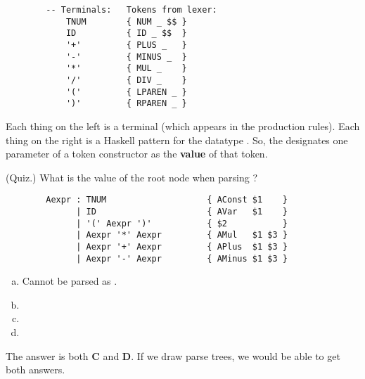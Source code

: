 \documentclass[letterpaper]{article}
\begin{document}
\begin{itemize}
    \begin{verbatim}
        -- Terminals:   Tokens from lexer:
            TNUM        { NUM _ $$ }
            ID          { ID _ $$  }
            '+'         { PLUS _   }
            '-'         { MINUS _  }
            '*'         { MUL _    }
            '/'         { DIV _    }
            '('         { LPAREN _ }
            ')'         { RPAREN _ }\end{verbatim}
    Each thing on the left is a terminal (which appears in the production rules). Each thing on the right is a Haskell pattern for the datatype . So, the \code{\$\$} designates one parameter of a token constructor as the \textbf{value} of that token. 
\end{itemize}

\begin{mdframed}[]
    (Quiz.) What is the value of the root  node when parsing ?

    \begin{verbatim}
        Aexpr : TNUM                    { AConst $1    }
              | ID                      { AVar   $1    }
              | '(' Aexpr ')'           { $2           }
              | Aexpr '*' Aexpr         { AMul   $1 $3 }
              | Aexpr '+' Aexpr         { APlus  $1 $3 } 
              | Aexpr '-' Aexpr         { AMinus $1 $3 }\end{verbatim}

    \begin{enumerate}[(a)]
        \item Cannot be parsed as .
        \item {}
        \item {}
        \item {}
    \end{enumerate}

    \begin{mdframed}[]
        The answer is both \textbf{C} and \textbf{D}. If we draw parse trees, we would be able to get both answers.
    \end{mdframed}
\end{mdframed}
\end{document}
